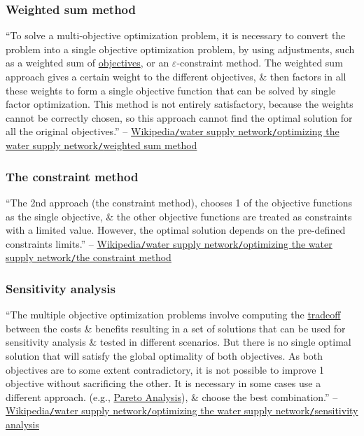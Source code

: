 \documentclass[oneside]{book}
\numberwithin{equation}{section}
\begin{document}
\subsubsection{Weighted sum method}
``To solve a multi-objective optimization problem, it is necessary to convert the problem into a single objective optimization problem, by using adjustments, such as a weighted sum of \href{https://en.wikipedia.org/wiki/Goal}{objectives}, or an $\varepsilon$-constraint method. The weighted sum approach gives a certain weight to the different objectives, \& then factors in all these weights to form a single objective function that can be solved by single factor optimization. This method is not entirely satisfactory, because the weights cannot be correctly chosen, so this approach cannot find the optimal solution for all the original objectives.'' -- \href{https://en.wikipedia.org/wiki/Water_supply_network#Weighted_sum_method}{Wikipedia\texttt{/}water supply network\texttt{/}optimizing the water supply network\texttt{/}weighted sum method}

\subsubsection{The constraint method}
``The 2nd approach (the constraint method), chooses 1 of the objective functions as the single objective, \& the other objective functions are treated as constraints with a limited value. However, the optimal solution depends on the pre-defined constraints limits.'' -- \href{https://en.wikipedia.org/wiki/Water_supply_network#The_constraint_method}{Wikipedia\texttt{/}water supply network\texttt{/}optimizing the water supply network\texttt{/}the constraint method}

\subsubsection{Sensitivity analysis}
``The multiple objective optimization problems involve computing the \href{https://en.wikipedia.org/wiki/Tradeoff}{tradeoff} between the costs \& benefits resulting in a set of solutions that can be used for sensitivity analysis \& tested in different scenarios. But there is no single optimal solution that will satisfy the global optimality of both objectives. As both objectives are to some extent contradictory, it is not possible to improve 1 objective without sacrificing the other. It is necessary in some cases use a different approach. (e.g., \href{https://en.wikipedia.org/wiki/Pareto_analysis}{Pareto Analysis}), \& choose  the best combination.'' -- \href{https://en.wikipedia.org/wiki/Water_supply_network#Sensitivity_analysis}{Wikipedia\texttt{/}water supply network\texttt{/}optimizing the water supply network\texttt{/}sensitivity analysis}
\end{document}
